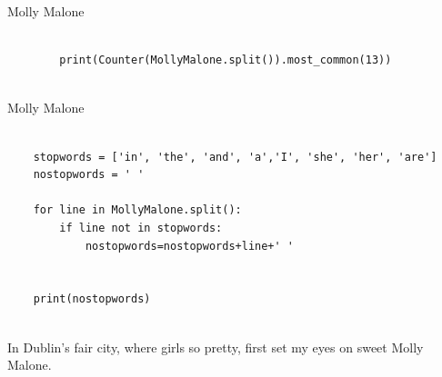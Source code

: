 \documentclass[handout]{beamer}
\begin{document}
\begin{frame}[fragile]{Molly Malone}
	
	\begin{lstlisting}
		
		print(Counter(MollyMalone.split()).most_common(13))
		
	\end{lstlisting}
	
	\begin{lstlistingoutput}
	\end{lstlistingoutput}

\end{frame}



\begin{frame}[fragile]{Molly Malone}
	
	\begin{lstlisting}
		
	stopwords = ['in', 'the', 'and', 'a','I', 'she', 'her', 'are']
	nostopwords = ' '

	for line in MollyMalone.split():
		if line not in stopwords:
			nostopwords=nostopwords+line+' '


	print(nostopwords)
		
	\end{lstlisting}
	
	\begin{lstlistingoutput}
	 In Dublin's fair city, where girls so pretty, first set my eyes on sweet Molly Malone. 
	\end{lstlistingoutput}


\end{frame}
\end{document}
